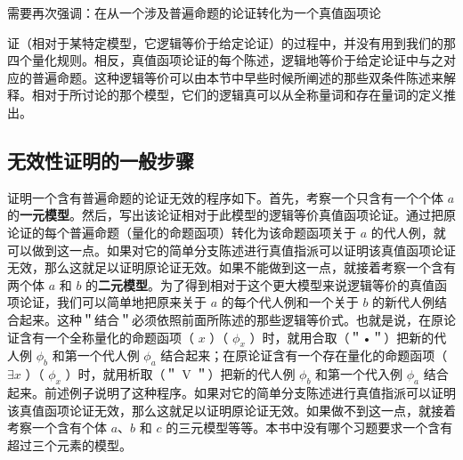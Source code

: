 需要再次强调：在从一个涉及普遍命题的论证转化为一个真值函项论

证（相对于某特定模型，它逻辑等价于给定论证）的过程中，并没有用到我们的那四个量化规则。相反，真值函项论证的每个陈述，逻辑地等价于给定论证中与之对应的普遍命题。这种逻辑等价可以由本节中早些时候所阐述的那些双条件陈述来解释。相对于所讨论的那个模型，它们的逻辑真可以从全称量词和存在量词的定义推出。

\subsection{无效性证明的一般步骤}

证明一个含有普遍命题的论证无效的程序如下。首先，考察一个只含有一个个体 $a$ 的\textbf{一元模型}。然后，写出该论证相对于此模型的逻辑等价真值函项论证。通过把原论证的每个普遍命题（量化的命题函项）转化为该命题函项关于 $a$ 的代人例，就可以做到这一点。如果对它的简单分支陈述进行真值指派可以证明该真值函项论证无效，那么这就足以证明原论证无效。如果不能做到这一点，就接着考察一个含有两个体 $a$ 和 $b$ 的\textbf{二元模型}。为了得到相对于这个更大模型来说逻辑等价的真值函项论证，我们可以简单地把原来关于 $a$ 的每个代人例和一个关于 $b$ 的新代人例结合起来。这种＂结合＂必须依照前面所陈述的那些逻辑等价式。也就是说，在原论证含有一个全称量化的命题函项（ $x$ ）（ $\phi_{x}$ ）时，就用合取（＂•＂）把新的代人例 $\phi_{b}$ 和第一个代人例 $\phi_{a}$ 结合起来；在原论证含有一个存在量化的命题函项（ $\exists x$ ）（ $\phi_{x}$ ）时，就用析取（＂ V ＂）把新的代人例 $\phi_{b}$ 和第一个代入例 $\phi_{a}$ 结合起来。前述例子说明了这种程序。如果对它的简单分支陈述进行真值指派可以证明该真值函项论证无效，那么这就足以证明原论证无效。如果做不到这一点，就接着考察一个含有个体 $a 、 b$ 和 $c$ 的三元模型等等。本书中没有哪个习题要求一个含有超过三个元素的模型。

